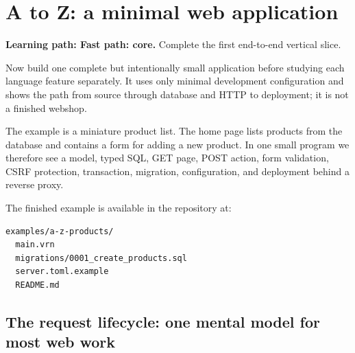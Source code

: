 \chapter{A to Z: a minimal web application}

\noindent\textbf{Learning path: Fast path: core.} Complete the first end-to-end vertical slice.\par\medskip





Now build one complete but intentionally small application before studying each language feature separately. It uses only minimal development configuration and shows the path from source through database and HTTP to deployment; it is not a finished webshop.

The example is a miniature product list. The home page lists products from the database and contains a form for adding a new product. In one small program we therefore see a model, typed SQL, GET page, POST action, form validation, CSRF protection, transaction, migration, configuration, and deployment behind a reverse proxy.

The finished example is available in the repository at:

\begin{lstlisting}
examples/a-z-products/
  main.vrn
  migrations/0001_create_products.sql
  server.toml.example
  README.md
\end{lstlisting}

\section{The request lifecycle: one mental model for most web work}

